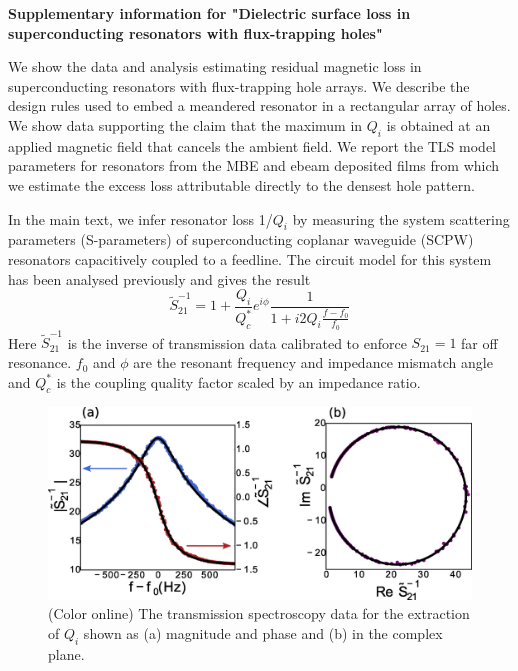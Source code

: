 \begin{center}
\textbf{Supplementary information for "Dielectric surface loss in superconducting resonators with flux-trapping holes"}
\end{center}

\def \Bcapp {\text{B}^{\text{cool}}_{\text{applied}}}

We show the data and analysis estimating residual magnetic loss in superconducting resonators with flux-trapping hole arrays. We describe the design rules used to embed a meandered resonator in a rectangular array of holes.  We show data supporting the claim that the maximum in $Q_{i}$ is obtained at an applied magnetic field that cancels the ambient field.  We report the TLS model parameters for resonators from the MBE and ebeam deposited films from which we estimate the excess loss attributable directly to the densest hole pattern.

In the main text, we infer resonator loss 1/$Q_i$ by measuring the system scattering parameters (S-parameters) of superconducting coplanar waveguide (SCPW) resonators capacitively coupled to a feedline.  The circuit model for this system has been analysed previously \cite{megrant2012} and gives the result 
\begin{equation}
\label{spectroscopyS21}
\tilde{S}_{21}^{-1} = 1 + \frac{Q_{i}}{Q_{c}^{*}}e^{i \phi}\frac{1}{1+i2 Q_{i} \frac{f-f_{0}}{f_{0}}}
\end{equation}
Here $\tilde{S}_{21}^{-1}$ is the inverse of transmission data calibrated to enforce $S_{21}=1$ far off resonance.  $f_{0}$ and $\phi$ are the resonant frequency and impedance mismatch angle and  $Q_{c}^{*}$ is the coupling quality factor scaled by an impedance ratio.

\begin{figure}[b]
\begin{center}
\includegraphics[width=240 pt]{DielectricFluxTrap_Supp_Rev2_basicfit.jpg}
\caption{(Color online)  The transmission spectroscopy data for the extraction of $Q_{i}$ shown as (a) magnitude and phase and (b) in the complex plane.}
\label{basicfit}
\end{center}
\end{figure}


